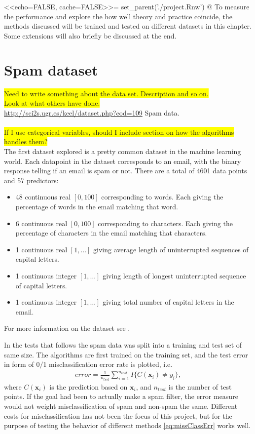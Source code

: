 <<echo=FALSE, cache=FALSE>>=
set_parent('./project.Rnw')
@
%
To measure the performance and explore the how well theory and practice coincide, the methods discussed will be trained and tested on different datasets in this chapter. Some extensions will also briefly be discussed at the end.

\section{Spam dataset}
\label{sec:Spam dataset}
\colorbox{yellow}{Need to write something about the data set. Description and so on.}\\
\colorbox{yellow}{Look at what others have done.} \\
\url{http://sci2s.ugr.es/keel/dataset.php?cod=109} Spam data.\\
\\
\colorbox{yellow}{If I use categorical variables, should I include section on how the algorithms handles them?}\\
 The first dataset explored is a pretty common dataset in the machine learning world. 
 Each datapoint in the dataset corresponds to an email, with the binary response telling if an email is spam or not. There are a total of 4601 data points and 57 predictors:
 \begin{itemize}
   \item 48 continuous real $[0, 100]$ corresponding to words. Each giving the percentage of words in the email matching that word. 
   \item 6 continuous real $[0, 100]$ corresponding to characters. Each giving the percentage of characters in the email matching that characters.
   \item 1 continuous real $[1, \ldots]$ giving average length of uninterrupted sequences of capital letters. 
   \item 1 continuous integer $[1, \ldots]$ giving length of longest uninterrupted sequence of capital letters.
   \item 1 continuous integer $[1, \ldots]$ giving total number of capital letters in the email.
 \end{itemize}
 For more information on the dataset see \cite{Spamdata}.

 In the tests that follows the spam data was split into a training and test set of same size. The algorithms are first trained on the training set, and the test error in form of $0/1$ misclassification error rate is plotted, i.e.
 \begin{align}
   \label{eq:missClassErr} 
   error =  \frac{1}{n_{test}} \sum_{i = 1}^{n_{test}} I\{C(\mathbf{x}_i) \neq y_i\},
 \end{align}
 where $C(\mathbf{x}_i)$ is the prediction based on $\mathbf{x}_i$, and $n_{test}$ is the number of test points. If the goal had been to actually make a spam filter, the error measure would not weight misclassification of spam and non-spam the same. Different costs for misclassification has not been the focus of this project, but for the purpose of testing the behavior of different methods \eqref{eq:missClassErr} works well.
 

